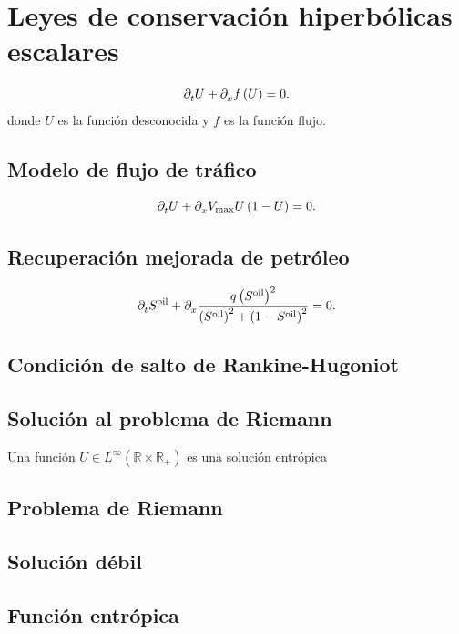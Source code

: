 \chapter{Leyes de conservación hiperbólicas escalares}

\begin{equation}
	\difcp{U}{t}+
	\difcp{f\left(U\right)}{x}=
	0.
\end{equation}
donde $U$ es la función desconocida y $f$ es la función flujo.

\section*{Modelo de flujo de tráfico}

\begin{equation}
	\difcp{U}{t}+
	\difcp{V_{\text{max}}U\left(1-U\right)}{x}=
	0.
\end{equation}

\section*{Recuperación mejorada de petróleo}

\begin{equation}
	\difcp{S^{\text{oil}}}{t}+
	\difcp{
		\frac{q\left(S^{\text{oil}}\right)^{2}}{\left(S^{\text{oil}}\right)^{2}+\left(1-S^{\text{oil}}\right)^{2}}
	}{x}=
	0.
\end{equation}

\section*{Condición de salto de Rankine-Hugoniot}

\section*{Solución al problema de Riemann}

Una función
$U\in L^{\infty}\left(\mathbb{R}\times\mathbb{R}_{+}\right)$
es una solución entrópica


\section{Problema de Riemann}
\section{Solución débil}
\section{Función entrópica}
